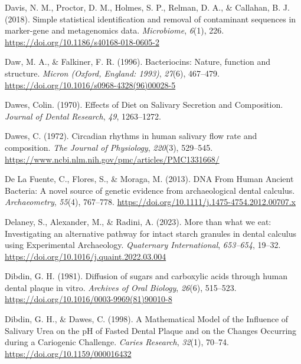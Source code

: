 \documentclass[
  letterpaper,
]{book}
\newlength{\cslhangindent}
\newlength{\cslentryspacingunit} %
\newenvironment{CSLReferences}[2] %
 {%
  \setlength{\parindent}{0pt}
  \ifodd #1
  \let\oldpar\par
  \def\par{\hangindent=\cslhangindent\oldpar}
  \fi
  \setlength{\parskip}{#2\cslentryspacingunit}
 }%
 {}
\begin{document}
\begin{CSLReferences}{1}{0}
\leavevmode{}%
Davis, N. M., Proctor, D. M., Holmes, S. P., Relman, D. A., \& Callahan,
B. J. (2018). Simple statistical identification and removal of
contaminant sequences in marker-gene and metagenomics data.
\emph{Microbiome}, \emph{6}(1), 226.
\url{https://doi.org/10.1186/s40168-018-0605-2}

\leavevmode{}%
Daw, M. A., \& Falkiner, F. R. (1996). Bacteriocins: Nature, function
and structure. \emph{Micron (Oxford, England: 1993)}, \emph{27}(6),
467--479. \url{https://doi.org/10.1016/s0968-4328(96)00028-5}

\leavevmode{}%
Dawes, Colin. (1970). Effects of {Diet} on {Salivary Secretion} and
{Composition}. \emph{Journal of Dental Research}, \emph{49}, 1263--1272.

\leavevmode{}%
Dawes, C. (1972). Circadian rhythms in human salivary flow rate and
composition. \emph{The Journal of Physiology}, \emph{220}(3), 529--545.
\url{https://www.ncbi.nlm.nih.gov/pmc/articles/PMC1331668/}

\leavevmode{}%
De La Fuente, C., Flores, S., \& Moraga, M. (2013). {DNA From Human
Ancient Bacteria}: {A} novel source of genetic evidence from
archaeological dental calculus. \emph{Archaeometry}, \emph{55}(4),
767--778. \url{https://doi.org/10.1111/j.1475-4754.2012.00707.x}

\leavevmode{}%
Delaney, S., Alexander, M., \& Radini, A. (2023). More than what we eat:
{Investigating} an alternative pathway for intact starch granules in
dental calculus using {Experimental Archaeology}. \emph{Quaternary
International}, \emph{653--654}, 19--32.
\url{https://doi.org/10.1016/j.quaint.2022.03.004}

\leavevmode{}%
Dibdin, G. H. (1981). Diffusion of sugars and carboxylic acids through
human dental plaque in vitro. \emph{Archives of Oral Biology},
\emph{26}(6), 515--523.
\url{https://doi.org/10.1016/0003-9969(81)90010-8}

\leavevmode{}%
Dibdin, G. H., \& Dawes, C. (1998). A {Mathematical Model} of the
{Influence} of {Salivary Urea} on the {pH} of {Fasted Dental Plaque} and
on the {Changes Occurring} during a {Cariogenic Challenge}. \emph{Caries
Research}, \emph{32}(1), 70--74. \url{https://doi.org/10.1159/000016432}


\end{CSLReferences}
\end{document}
